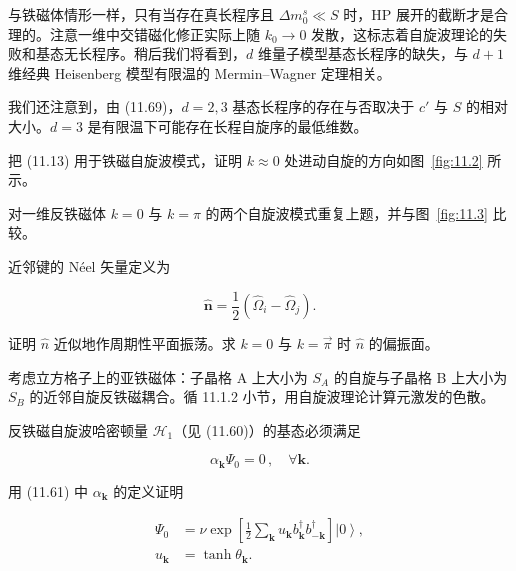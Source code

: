 与铁磁体情形一样，只有当存在真长程序且 $\Delta m_{0}^{s} \ll S$ 时，HP 展开的截断才是合理的。注意一维中交错磁化修正实际上随 $k_{0} \to 0$ 发散，这标志着自旋波理论的失败和基态无长程序。稍后我们将看到，$d$ 维量子模型基态长程序的缺失，与 $d+1$ 维经典 Heisenberg 模型有限温的 Mermin--Wagner 定理相关。

我们还注意到，由 (11.69)，$d = 2, 3$ 基态长程序的存在与否取决于 $c'$ 与 $S$ 的相对大小。$d=3$ 是有限温下可能存在长程自旋序的最低维数。

\begin{exercises}

\item 把 (11.13) 用于铁磁自旋波模式，证明 $k \approx 0$ 处进动自旋的方向如图~\ref{fig:11.2} 所示。

\item 对一维反铁磁体 $k = 0$ 与 $k = \pi$ 的两个自旋波模式重复上题，并与图~\ref{fig:11.3} 比较。

\item 近邻键的 Néel 矢量定义为

\begin{equation*}
\hat {\mathbf {n}} = \frac {1}{2} \left( \hat {\Omega} _ {i} - \hat {\Omega} _ {j} \right).
\tag{11.71}
\end{equation*}

证明 $\hat{n}$ 近似地作周期性平面振荡。求 $k = 0$ 与 $k = \vec{\pi}$ 时 $\hat{n}$ 的偏振面。

\item 考虑立方格子上的亚铁磁体：子晶格 A 上大小为 $S_{A}$ 的自旋与子晶格 B 上大小为 $S_{B}$ 的近邻自旋反铁磁耦合。循 11.1.2 小节，用自旋波理论计算元激发的色散。

\item 反铁磁自旋波哈密顿量 $\mathcal{H}_1$（见 (11.60)）的基态必须满足

\begin{equation*}
\alpha_ {\mathbf {k}} \Psi_ {0} = 0 \, , \quad \forall \mathbf {k}.
\tag{11.72}
\end{equation*}

用 (11.61) 中 $\alpha_{\mathbf{k}}$ 的定义证明

\begin{align*}
\Psi_ {0} & = \nu \exp \left[ \frac {1}{2} \sum_ {\mathbf {k}} u _ {\mathbf {k}} b _ {\mathbf {k}} ^ {\dagger} b _ {- \mathbf {k}} ^ {\dagger} \right] \left| 0 \right\rangle ,\\
u _ {\mathbf {k}} & = \tanh \theta_ {\mathbf {k}} .
\tag{11.73}
\end{align*}


\end{exercises}
